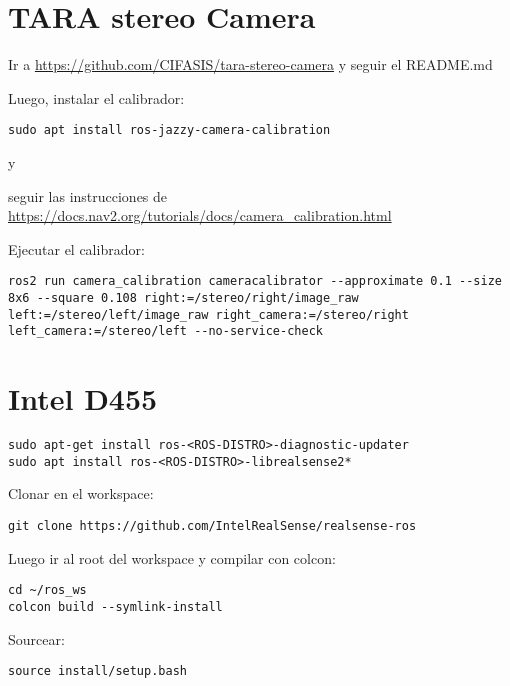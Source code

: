 \documentclass[apunte]{lcc}
\begin{document}
\maketitle

\section{TARA stereo Camera}

Ir a \url{https://github.com/CIFASIS/tara-stereo-camera} y seguir el README.md

Luego, instalar el calibrador:

\begin{lstlisting}[style=bash]
sudo apt install ros-jazzy-camera-calibration
\end{lstlisting}

y 

seguir las instrucciones de \url{https://docs.nav2.org/tutorials/docs/camera_calibration.html}


Ejecutar el calibrador:

\begin{lstlisting}[style=bash]
ros2 run camera_calibration cameracalibrator --approximate 0.1 --size 8x6 --square 0.108 right:=/stereo/right/image_raw left:=/stereo/left/image_raw right_camera:=/stereo/right left_camera:=/stereo/left --no-service-check
\end{lstlisting}


\section{Intel D455}

\begin{lstlisting}[style=bash]
sudo apt-get install ros-<ROS-DISTRO>-diagnostic-updater
sudo apt install ros-<ROS-DISTRO>-librealsense2*
\end{lstlisting}

Clonar en el workspace:
\begin{lstlisting}[style=bash]
git clone https://github.com/IntelRealSense/realsense-ros
\end{lstlisting}

Luego ir al root del workspace y compilar con colcon:
\begin{lstlisting}[style=bash]
cd ~/ros_ws
colcon build --symlink-install
\end{lstlisting}

Sourcear:

\begin{lstlisting}[style=bash]
source install/setup.bash
\end{lstlisting}
\end{document}
